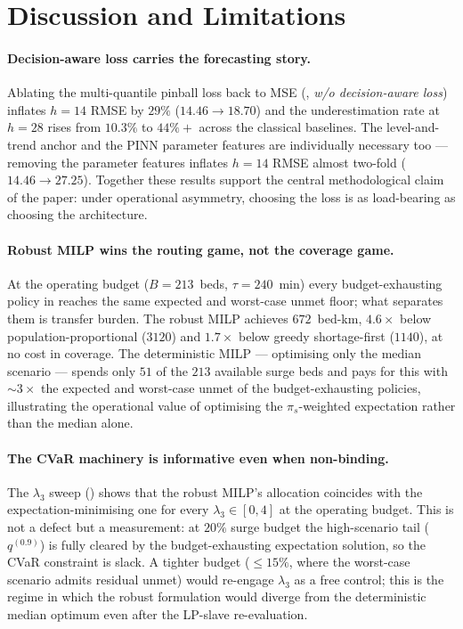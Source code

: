 \section{Discussion and Limitations}\label{sec:discussion}

\paragraph{Decision-aware loss carries the forecasting story.}
Ablating the multi-quantile pinball loss back to MSE
(, \emph{w/o decision-aware loss})
inflates $h = 14$ RMSE by $29\%$ ($14.46 \to 18.70$) and the
under\-estimation rate at $h = 28$ rises from $10.3\%$ to $44\%+$
across the classical baselines. The level-and-trend anchor and the
PINN parameter features are individually necessary too --- removing
the parameter features inflates $h = 14$ RMSE almost two-fold
($14.46 \to 27.25$). Together these results support the central
methodological claim of the paper: under operational asymmetry,
choosing the loss is as load-bearing as choosing the architecture.

\paragraph{Robust MILP wins the routing game, not the coverage game.}
At the operating budget ($B = 213$~beds, $\tau = 240$~min) every
budget-exhausting policy in  reaches the same
expected and worst-case unmet floor; what separates them is transfer
burden. The robust MILP achieves $672$~bed-km, $4.6\times$ below
population-proportional ($3120$) and $1.7\times$ below greedy
shortage-first ($1140$), at no cost in coverage. The deterministic
MILP --- optimising only the median scenario --- spends only $51$ of
the $213$ available surge beds and pays for this with $\sim 3\times$
the expected and worst-case unmet of the budget-exhausting policies,
illustrating the operational value of optimising the
$\pi_s$-weighted expectation rather than the median alone.

\paragraph{The CVaR machinery is informative even when non-binding.}
The $\lambda_3$ sweep () shows that the robust MILP's
allocation coincides with the expectation-minimising one for every
$\lambda_3 \in [0, 4]$ at the operating budget. This is not a defect
but a measurement: at $20\%$ surge budget the high-scenario tail
($q^{(0.9)}$) is fully cleared by the budget-exhausting expectation
solution, so the CVaR constraint is slack. A tighter budget ($\leq
15\%$, where the worst-case scenario admits residual unmet) would
re-engage $\lambda_3$ as a free control; this is the regime in which
the robust formulation would diverge from the deterministic median
optimum even after the LP-slave re-evaluation.

